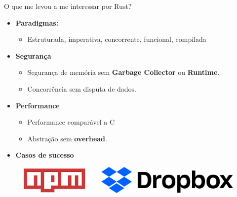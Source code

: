 \begin{frame}[fragile]{O que me levou a me interessar por Rust?}
\begin{center}
\begin{itemize}
    \item \textbf{Paradigmas:}
    \begin{itemize}
        \item Estruturada, imperativa, concorrente, funcional, compilada
    \end{itemize}{}
    \item \textbf{Segurança}
    \begin{itemize}
        \item Segurança de memória sem \textbf{Garbage Collector} ou \textbf{Runtime}.
        \item Concorrência sem disputa de dados.
    \end{itemize}
    \item \textbf{Performance}
    \begin{itemize}
        \item Performance comparável a C
        \item Abstração sem \textbf{overhead}.
    \end{itemize}{}
    \item \textbf{Casos de sucesso}
\end{itemize}
\end{center}
\begin{center}
    \begin{figure}[ht!]
  \centering
  \includegraphics[scale=0.6]{images/cases.png}
\end{figure}
\end{center}{}
\end{frame}

